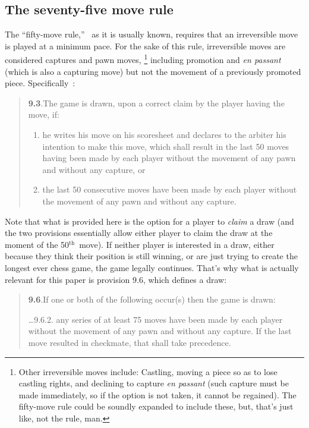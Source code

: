 \documentclass[twocolumn]{article}
\renewcommand\th{$^{\mathrm{th}}$}
\begin{document}
\subsection{The seventy-five move rule} \label{sec:75}

The ``fifty-move rule,''~\cite{wikipedia50move} as it is usually
known, requires that an irreversible move is played at a minimum pace.
For the sake of this rule, irreversible moves are considered captures
and pawn moves,%
\footnote{ Other irreversible moves include: Castling, moving a piece
  so as to lose castling rights, and declining to capture {\it en
    passant} (such capture must be made immediately, so if the option
  is not taken, it cannot be regained). The fifty-move rule could be
  soundly expanded to include these, but, that's just like, not the
  rule, man.}
%
including promotion and {\it en passant} (which is also a capturing
move) but not the movement of a previously promoted piece.
Specifically~\cite{fiderules}:

\begin{quote}
{\bf 9.3}.\quad The game is drawn, upon a correct claim by the player having
the move, if:
  \begin{enumerate}[label=\alph*.]
    \item he writes his move on his scoresheet and declares to the
      arbiter his intention to make this move, which shall result in
      the last 50 moves having been made by each player without the
      movement of any pawn and without any capture, or
    \item the last 50 consecutive moves have been made by each player
      without the movement of any pawn and without any capture.
  \end{enumerate}
\end{quote}

Note that what is provided here is the option for a player to {\em
  claim} a draw (and the two provisions essentially allow either player
to claim the draw at the moment of the 50\th\ move). If neither player
is interested in a draw, either because they think their position is
still winning, or are just trying to create the longest ever chess game,
the game legally continues. That's why what is actually relevant for this
paper is provision 9.6, which defines a draw:

\begin{quote}
  {\bf 9.6}.\quad If one or both of the following occur(s) then the
  game is drawn:

  \ldots 9.6.2. any series of at least 75 moves have been made by each
  player without the movement of any pawn and without any capture. If
  the last move resulted in checkmate, that shall take precedence.
\end{quote}
\end{document}

